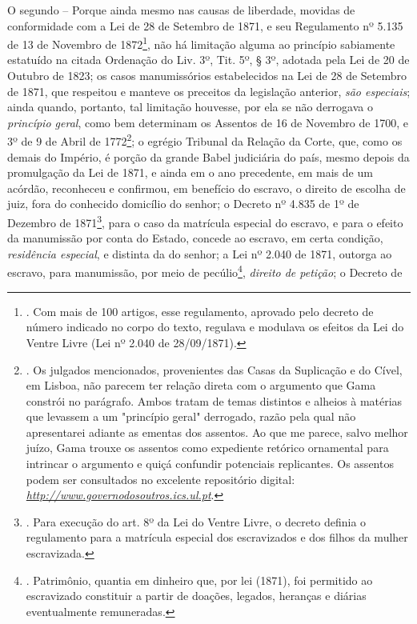 O segundo -- Porque ainda mesmo nas causas de liberdade, movidas de
conformidade com a Lei de 28 de Setembro de 1871, e seu Regulamento nº
5.135 de 13 de Novembro de 1872\footnote{. Com mais de 100 artigos, esse
  regulamento, aprovado pelo decreto de número indicado no corpo do
  texto, regulava e modulava os efeitos da Lei do Ventre Livre (Lei nº
  2.040 de 28/09/1871).}, não há limitação alguma ao princípio
sabiamente estatuído na citada Ordenação do Liv. 3º, Tit. 5º, § 3º,
adotada pela Lei de 20 de Outubro de 1823; os casos manumissórios
estabelecidos na Lei de 28 de Setembro de 1871, que respeitou e manteve
os preceitos da legislação anterior, \emph{são especiais}; ainda quando,
portanto, tal limitação houvesse, por ela se não derrogava o
\emph{princípio geral}, como bem determinam os Assentos de 16 de
Novembro de 1700, e 3º de 9 de Abril de 1772\footnote{. Os julgados
  mencionados, provenientes das Casas da Suplicação e do Cível, em
  Lisboa, não parecem ter relação direta com o argumento que Gama
  constrói no parágrafo. Ambos tratam de temas distintos e alheios à
  matérias que levassem a um "princípio geral" derrogado, razão pela
  qual não apresentarei adiante as ementas dos assentos. Ao que me
  parece, salvo melhor juízo, Gama trouxe os assentos como expediente
  retórico ornamental para intrincar o argumento e quiçá confundir
  potenciais replicantes. Os assentos podem ser consultados no excelente
  repositório digital:
  \href{http://www.governodosoutros.ics.ul.pt/}{\emph{http://www.governodosoutros.ics.ul.pt}}.};
o egrégio Tribunal da Relação da Corte, que, como os demais do Império,
é porção da grande Babel judiciária do país, mesmo depois da promulgação
da Lei de 1871, e ainda em o ano precedente, em mais de um acórdão,
reconheceu e confirmou, em benefício do escravo, o direito de escolha de
juiz, fora do conhecido domicílio do senhor; o Decreto nº 4.835 de 1º de
Dezembro de 1871\footnote{. Para execução do art. 8º da Lei do Ventre
  Livre, o decreto definia o regulamento para a matrícula especial dos
  escravizados e dos filhos da mulher escravizada.}, para o caso da
matrícula especial do escravo, e para o efeito da manumissão por conta
do Estado, concede ao escravo, em certa condição, \emph{residência
especial}, e distinta da do senhor; a Lei nº 2.040 de 1871, outorga ao
escravo, para manumissão, por meio de pecúlio\footnote{. Patrimônio,
  quantia em dinheiro que, por lei (1871), foi permitido ao escravizado
  constituir a partir de doações, legados, heranças e diárias
  eventualmente remuneradas.}, \emph{direito de petição}; o Decreto de
